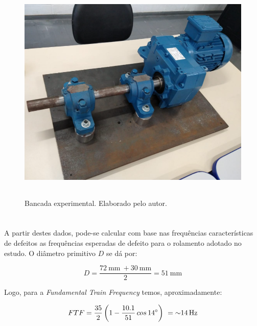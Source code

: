 \documentclass[
	12pt,				
	oneside,			
	a4paper,			
	english,			
	brazil,			
	]{abntex2ppgsi}
\begin{document}
\begin{figure}[H]
\centering
\caption {Bancada experimental. Elaborado pelo autor.}
\includegraphics[width=\textwidth,height=100mm,keepaspectratio]{bancada_de_testes}
\label{bancada_de_testes}
\end{figure}

 
\section{}

A partir destes dados, pode-se calcular com base nas frequências características de defeitos as frequências esperadas de defeito para o rolamento adotado no estudo. O diâmetro primitivo $D$ se dá por: 

\begin{equation}
	D = \frac{\SI{72}{\mm} \ + \SI{30}{\mm}}{2} = \SI{51}{\mm}
	\label{eq: Diametro Primitivo no Rolamento}
\end{equation}



Logo, para a \textit{Fundamental Train Frequency} temos, aproximadamente:

\begin{equation}
	FTF = \frac{35}{2} \left ( 1 - \frac{10.1}{51} \,cos \, \ang{14} \right )  \ = \SI{~14}{{\hertz}}
	\label{eq: FTF no  Rolamento}
\end{equation}

\end{document}
